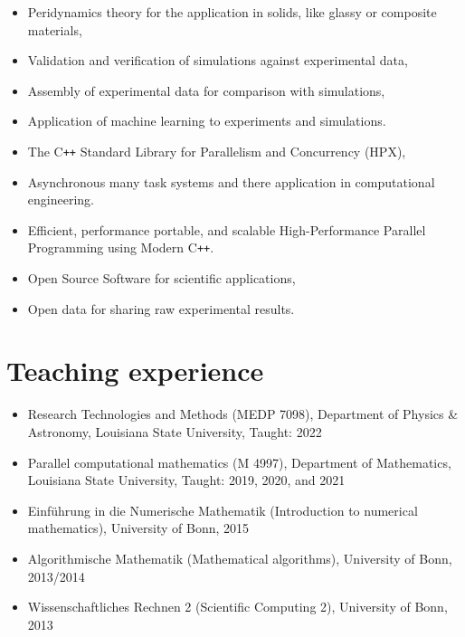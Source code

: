 \documentclass[11pt,a4paper,sans]{moderncv}
\begin{document}
\begin{itemize}[leftmargin=4cm]
\item Peridynamics theory for the application in solids, like glassy or composite materials,
\item Validation and verification of simulations against experimental data,
\item Assembly of experimental data for comparison with simulations,
\item Application of machine learning to experiments and simulations.
\end{itemize}
\begin{itemize}[leftmargin=4cm]
\item The C\texttt{++} Standard Library for Parallelism and Concurrency (HPX),
\item Asynchronous many task systems and there application in computational engineering.
\item Efficient, performance portable, and scalable High-Performance Parallel Programming using Modern C\texttt{++}.
\end{itemize}
\begin{itemize}[leftmargin=4cm]
\item Open Source Software for scientific applications,
\item Open data for sharing raw experimental results.
\end{itemize}
\section{Teaching experience}
\begin{itemize}[leftmargin=4cm]
\item Research Technologies and Methods (MEDP 7098), Department of Physics \& Astronomy, Louisiana State University, Taught: 2022
\item Parallel computational mathematics (M 4997), Department of Mathematics,  Louisiana State University, Taught: 2019, 2020, and 2021
\end{itemize}

\begin{itemize}[leftmargin=4cm]
\item Einf\"uhrung in die Numerische Mathematik (Introduction to numerical mathematics), University of Bonn, 2015
\item Algorithmische Mathematik (Mathematical algorithms), University of Bonn, 2013/2014
\item Wissenschaftliches Rechnen 2 (Scientific Computing 2),  University of Bonn, 2013 
\end{itemize}
\end{document}
